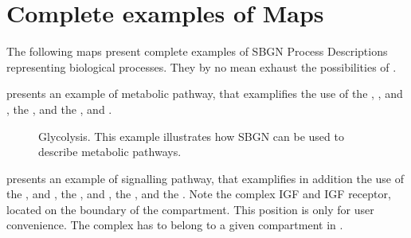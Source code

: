 \chapter{Complete examples of \PD Maps}

The following maps present complete examples of SBGN Process Descriptions representing biological processes. They by no mean exhaust the possibilities of  \SBGNPDLone.

 presents an example of metabolic pathway, that examplifies the use of the  , , and , the  , and the  ,  and .

\begin{figure}[htb]
\begin{center}
\caption{Glycolysis. This example illustrates how SBGN can be used to describe metabolic pathways.}\label{fig:glycolysis}
\end{center}
\end{figure}

 presents an example of signalling pathway, that examplifies in addition the use of the  , and , the  ,  and , the  , and the  . Note the complex IGF and IGF receptor, located on the boundary of the compartment. This position is only for user convenience. The complex has to belong to a given compartment in \SBGNPDLone.

